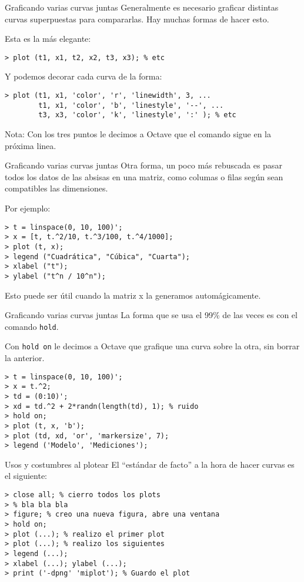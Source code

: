 \begin{frame}[fragile]{Graficando varias curvas juntas}
Generalmente es necesario graficar distintas curvas superpuestas para compararlas. Hay muchas formas de hacer esto.

Esta es la más elegante:
\begin{lstlisting}
> plot (t1, x1, t2, x2, t3, x3); % etc
\end{lstlisting}

Y podemos decorar cada curva de la forma:
\begin{lstlisting}
> plot (t1, x1, 'color', 'r', 'linewidth', 3, ...
        t1, x1, 'color', 'b', 'linestyle', '--', ...
        t3, x3, 'color', 'k', 'linestyle', ':' ); % etc
\end{lstlisting}

Nota: Con los tres puntos le decimos a Octave que el comando sigue en la próxima linea.
\end{frame}

\begin{frame}[fragile]{Graficando varias curvas juntas}
Otra forma, un poco más  rebuscada es pasar todos los datos de las absisas en una matriz, como columas o filas según sean compatibles las dimensiones.

Por ejemplo:
\begin{lstlisting}
> t = linspace(0, 10, 100)';
> x = [t, t.^2/10, t.^3/100, t.^4/1000];
> plot (t, x);
> legend ("Cuadrática", "Cúbica", "Cuarta");
> xlabel ("t");
> ylabel ("t^n / 10^n");
\end{lstlisting}

Esto puede ser útil cuando la matriz x la generamos automágicamente.
\end{frame}

\begin{frame}[fragile]{Graficando varias curvas juntas}
La forma que se usa el 99\% de las veces es con el comando \verb$hold$.

Con \verb$hold on$ le decimos a Octave que grafique una curva sobre la otra, sin borrar la anterior.

\begin{lstlisting}
> t = linspace(0, 10, 100)';
> x = t.^2;
> td = (0:10)';
> xd = td.^2 + 2*randn(length(td), 1); % ruido
> hold on;
> plot (t, x, 'b');
> plot (td, xd, 'or', 'markersize', 7);
> legend ('Modelo', 'Mediciones');
\end{lstlisting}
\end{frame}

\begin{frame}[fragile]{Usos y costumbres al plotear}
El ``estándar de facto'' a la hora de hacer curvas es el siguiente:

\begin{lstlisting}
> close all; % cierro todos los plots
> % bla bla bla
> figure; % creo una nueva figura, abre una ventana
> hold on;
> plot (...); % realizo el primer plot
> plot (...); % realizo los siguientes
> legend (...);
> xlabel (...); ylabel (...);
> print ('-dpng' 'miplot'); % Guardo el plot
\end{lstlisting}
\end{frame}

